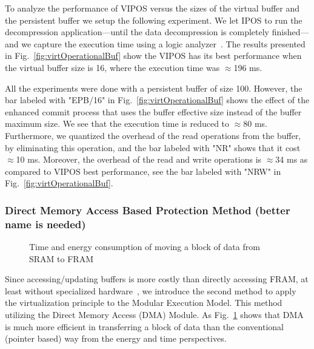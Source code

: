 \documentclass[sigconf,anonymous,review]{acmart}
\begin{document}
			To analyze the performance of VIPOS versus the sizes of the virtual buffer and the persistent buffer we setup the following experiment. We let IPOS to run the decompression application---until the data decompression is completely finished---and we capture the execution time using a logic analyzer~\cite{xxx}. The results presented in Fig.~\ref{fig:virtOperationalBuf} show the VIPOS has its best performance when the virtual buffer size is 16, where the execution time was $\approx$196 ms. 

			All the experiments were done with a persistent buffer of size 100. However, the bar labeled with "EPB/16" in  Fig.~\ref{fig:virtOperationalBuf} shows the effect of the enhanced commit process that uses the buffer effective size instead of the buffer maximum size. We see that the execution time is reduced to $\approx$80 ms. Furthermore, we quantized the overhead of the read operations from the buffer, by eliminating this operation, and the bar labeled with "NR" shows that it cost  $\approx$10 ms. Moreover, the overhead of the read and write operations is $\approx$34 ms as compared to VIPOS best performance, see the bar labeled with "NRW" in Fig.~\ref{fig:virtOperationalBuf}. 


\subsubsection{ Direct Memory Access Based Protection Method (better name is needed)}
%
	\begin{figure}[t]
		\centering
		\caption{Time and energy consumption of moving a block of data from SRAM to FRAM}
		\label{fig:dmaTimeEnergy}
	\end{figure}
%
	Since accessing/updating buffers is more costly than directly accessing FRAM, at least without specialized hardware~\cite{clank}, we introduce the second method to apply the virtualization principle to the Modular Execution Model. This method utilizing the Direct Memory Access (DMA) Module. As Fig.~\ref{fig:dmaTimeEnergy} shows that DMA is much more efficient in transferring a block of data than the conventional (pointer based) way from the energy and time perspectives. 
\end{document}
